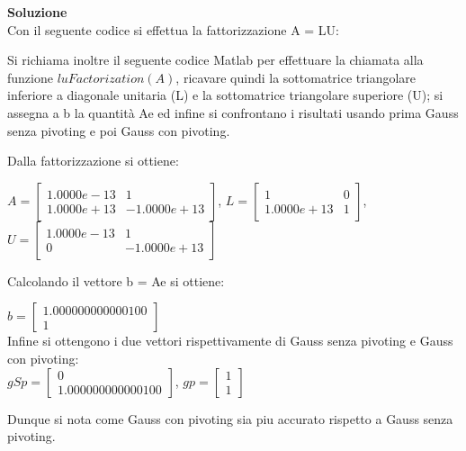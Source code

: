 \large\noindent{}
\begin{flushleft}
	\large \textbf{Soluzione}\\[0.5cm]
	Con il seguente codice si effettua la fattorizzazione A = LU:
	
	Si richiama inoltre il seguente codice Matlab per effettuare la chiamata alla funzione $luFactorization(A)$, ricavare quindi la sottomatrice triangolare inferiore a diagonale unitaria (L) e la sottomatrice triangolare superiore (U); si assegna a b la quantità Ae ed infine si confrontano i risultati usando prima Gauss senza pivoting e poi Gauss con pivoting.
	
	Dalla fattorizzazione si ottiene:\\[0.5cm]
	\begin{center}
	$A = \begin{bmatrix}
				1.0000e-13 & 1\\
				1.0000e+13 & -1.0000e+13
			\end{bmatrix}$,
			$L = \begin{bmatrix}
				1& 0\\
				1.0000e+13 & 1
			\end{bmatrix}$,
			$U = \begin{bmatrix}
				1.0000e-13 & 1\\
				0 & -1.0000e+13
			\end{bmatrix}$\\[0.5cm]
			\end{center}
			Calcolando il vettore b = Ae si ottiene:\\[0.5cm]
			\begin{center}
			$ b = \begin{bmatrix}
				1.000000000000100\\
				1
			\end{bmatrix}$\\[0.5cm]
			Infine si ottengono i due vettori rispettivamente di Gauss senza pivoting e Gauss con pivoting:\\[0.5cm]
			$ gSp = \begin{bmatrix}
				0\\
				1.000000000000100
			\end{bmatrix}$, 
			$ gp = \begin{bmatrix}
				1\\
				1
			\end{bmatrix}$
			\end{center}
			Dunque si nota come Gauss con pivoting sia piu accurato rispetto a Gauss senza pivoting.
	\end{flushleft}
	